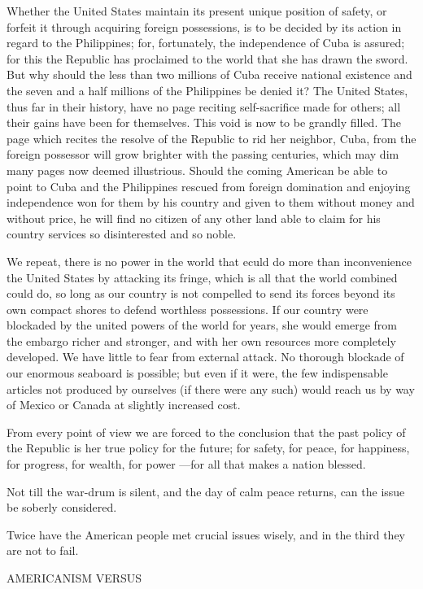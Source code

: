 \documentclass[11pt,openany]{book}
\begin{document}
Whether the United States maintain its present unique position of safety, or forfeit it through acquiring foreign possessions, is to be decided by its action in regard to the Philippines; for, fortunately, the independence of Cuba is assured; for this the Republic has proclaimed to the world that she has drawn the sword. But why should the less than two millions of Cuba receive national existence and the seven and a half millions of the Philippines be denied it? The United States, thus far in their history, have no page reciting self-sacrifice made for others; all their gains have been for themselves. This void is now to be grandly filled. The page which recites the resolve of the Republic to rid her neighbor, Cuba, from the foreign possessor will grow brighter with the passing centuries, which may dim many pages now deemed illustrious. Should the coming American be able to point to Cuba and the Philippines rescued from foreign domination and enjoying independence won for them by his country and given to them without money and without price, he will find no citizen of any other land able to claim for his country services so disinterested and so noble.

We repeat, there is no power in the world that eculd do more than inconvenience the United States by attacking its fringe, which is all that the world combined could do, so long as our country is not compelled to send its forces beyond its own compact shores to defend worthless possessions. If our country were blockaded by the united powers of the world for years, she would emerge from the embargo richer and stronger, and with her own resources more completely developed. We have little to fear from external attack. No thorough blockade of our enormous seaboard is possible; but even if it were, the few indispensable articles not produced by ourselves (if there were any such) would reach us by way of Mexico or Canada at slightly increased cost.

From every point of view we are forced to the conclusion that the past policy of the Republic is her true policy for the future; for safety, for peace, for happiness, for progress, for wealth, for power ---for all that makes a nation blessed.

Not till the war-drum is silent, and the day of calm peace returns, can the issue be soberly considered.

Twice have the American people met crucial issues wisely, and in the third they are not to fail.

AMERICANISM VERSUS
\end{document}
